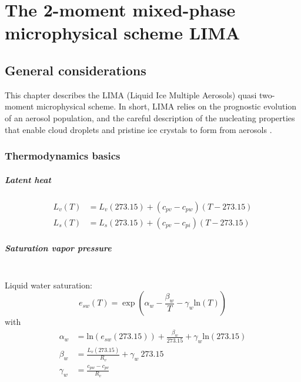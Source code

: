 \chapter{The 2-moment mixed-phase microphysical scheme LIMA}
\minitoc


\section{General considerations}
This chapter describes the LIMA (Liquid Ice Multiple Aerosols) quasi two-moment microphysical scheme.
In short, LIMA relies on the prognostic evolution of an aerosol population, and the careful description of the nucleating properties that enable cloud droplets and pristine ice crystals to form from aerosols \citep{Vie2016}. 

\subsection{Thermodynamics basics}

\paragraph{Latent heat}
\begin{align}
 \label{latent-heat-vaporization}
 L_v(T) &= L_v(273.15) + (c_{pv} - c_{pw}) (T-273.15) \\
 \label{latent-heat-sublimation}
 L_s(T) &= L_s(273.15) + (c_{pv} - c_{pi}) (T-273.15)
\end{align}

\paragraph{Saturation vapor pressure}
~\\
Liquid water saturation:
\begin{equation}
 \label{saturation-pressure-water}
 e_{sw}(T) = \exp(\alpha_w - \frac{\beta_w}{T} - \gamma_w\mathrm{ln}(T))
\end{equation}
with
\begin{align}
 \alpha_w &= \mathrm{ln}(e_{sw}(273.15)) + \frac{\beta_w}{273.15} + \gamma_w\mathrm{ln}(273.15) \\
 \beta_w &= \frac{L_v(273.15)}{R_v} + \gamma_w ~ 273.15 \\
 \gamma_w &= \frac{c_{pw} - c_{pv}}{R_v}
\end{align}

